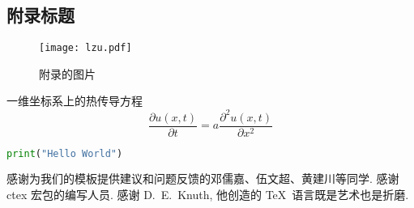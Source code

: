 \documentclass{lzuthesis}
\begin{document}
\begin{appendix}
	
\section{附录标题}

\begin{figure}[!h]
	\centering
	\texttt{[image: lzu.pdf]}
	\caption{附录的图片}
	\label{pp1}
\end{figure}

一维坐标系上的热传导方程
\begin{equation}
	\label{eq1}
	\frac{\partial u(x,t)}{\partial t}
	= a\frac{\partial ^{2}u(x,t)}{\partial x^{2}}
\end{equation}

\begin{lstlisting}[language=python, caption={helloworld.py}]
print("Hello World")
\end{lstlisting}
	
\end{appendix}

\begin{acknowledgement}
	感谢为我们的模板提供建议和问题反馈的邓儒嘉、伍文超、黄建川等同学.
	感谢 ctex 宏包的编写人员. 感谢 D.~E.~Knuth, 他创造的 \TeX\
	语言既是艺术也是折磨.
\end{acknowledgement}

\makereviews
\end{document}
